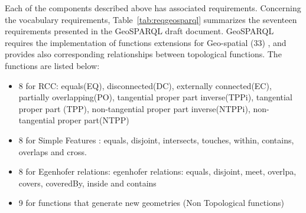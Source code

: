 \begin{table}[ht!b]
\end{table}

 Each of the components described above has associated requirements. Concerning the vocabulary requirements, Table~\ref{tab:reqgeosparql} summarizes the seventeen requirements presented in the GeoSPARQL draft document. GeoSPARQL requires the implementation of functions extensions for Geo-spatial (33) , and provides also corresponding relationships between topological functions. The functions are listed below:
 \begin{itemize}
 \item 8 for RCC: equals(EQ), disconnected(DC), externally connected(EC), partially overlapping(PO), tangential proper part inverse(TPPi), tangential proper part (TPP), non-tangential proper part inverse(NTPPi), non-tangential proper part(NTPP)
\item 8 for Simple Features : equals, disjoint, intersects, touches, within, contains, overlaps and cross.
\item 8 for Egenhofer relations: egenhofer relations: equals, disjoint, meet, overlpa, covers, coveredBy, inside and contains
\item 9 for functions that generate new geometries (Non Topological functions) 
 \end{itemize}




